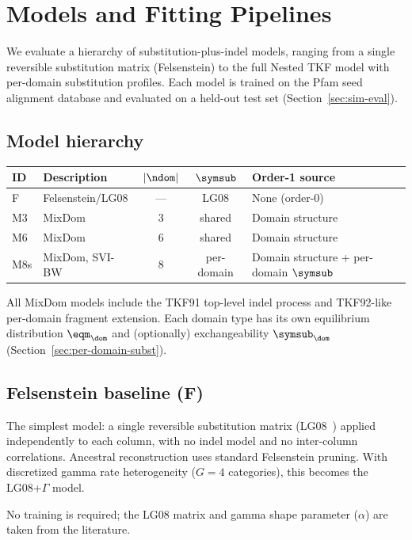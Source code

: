 \section{Models and Fitting Pipelines}
\label{sec:models-fitted}

We evaluate a hierarchy of substitution-plus-indel models,
ranging from a single reversible substitution matrix (Felsenstein)
to the full Nested TKF model with per-domain substitution profiles.
Each model is trained on the Pfam seed alignment database
and evaluated on a held-out test set (Section~\ref{sec:sim-eval}).

\subsection{Model hierarchy}

\begin{center}
\begin{tabular}{llccp{5cm}}
\textbf{ID} & \textbf{Description} & $|\ndom|$ & $\symsub$ & \textbf{Order-1 source} \\
\hline
F & Felsenstein/LG08 & --- & LG08 & None (order-0) \\
M3 & MixDom & 3 & shared & Domain structure \\
M6 & MixDom & 6 & shared & Domain structure \\
M8s & MixDom, SVI-BW & 8 & per-domain & Domain structure + per-domain $\symsub$ \\
\end{tabular}
\end{center}

All MixDom models include the TKF91 top-level indel process
and TKF92-like per-domain fragment extension.
Each domain type has its own equilibrium distribution $\eqm_\dom$
and (optionally) exchangeability $\symsub_\dom$
(Section~\ref{sec:per-domain-subst}).

\subsection{Felsenstein baseline (F)}

The simplest model: a single reversible substitution matrix (LG08~\cite{LG08})
applied independently to each column, with no indel model and no
inter-column correlations.
Ancestral reconstruction uses standard Felsenstein pruning.
With discretized gamma rate heterogeneity ($G = 4$ categories),
this becomes the LG08+$\Gamma$ model.

No training is required; the LG08 matrix and gamma shape parameter
($\alpha$) are taken from the literature.

